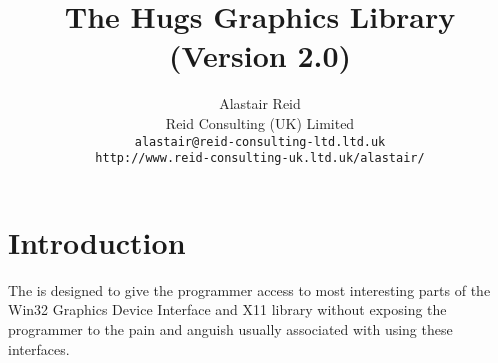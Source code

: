 \newenvironment{portability}{%
  \noindent
  \begingroup
    \small
    {\bf Portability Note: }
    \nobreak
    \sl
    \begin{itemize}
    \itemsep0pt
}{%
    \end{itemize}
    \nobreak
    {\bf End Portability Note.}
  \endgroup
}

\def\NotInX#1{{#1} is not provided in the X11 implementation of this library.}
\def\NotInWin#1{{#1} is not provided in the Win32 implementation of this library.}


\newcommand{\HeyPaul}[1]{\par{{\bf Hey Paul:} \sl #1}\par}
\newcommand{\ToDo}[1]{\par{{\bf ToDo:} \sl #1}\par}

\newenvironment{outline}{%
  \noindent
  {\bf Outline: }
  \begingroup
    \nobreak
    \sl
}{%
  \endgroup
  \nobreak
  {\bf End outline.}
}

%



\title{%
  The Hugs Graphics Library\\
  (Version 2.0)%
}

\author{Alastair Reid\\
Reid Consulting (UK) Limited\\
{\tt alastair@reid-consulting-ltd.ltd.uk}\\
{\tt http://www.reid-consulting-uk.ltd.uk/alastair/}}


\maketitle


\section{Introduction}\label{introduction}

The \Library{} is designed to give the programmer access to
most interesting parts of the Win32 Graphics Device Interface and X11
library without exposing the programmer to the pain and anguish
usually associated with using these interfaces.

